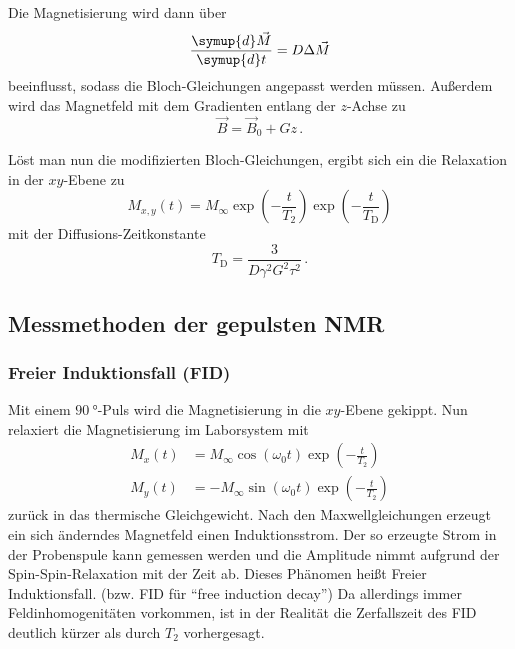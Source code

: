 Die Magnetisierung wird dann über
\begin{equation}
    \frac{\symup{d} \vec{M}}{\symup{d} t} = D \Delta \vec{M}
\end{equation}
beeinflusst, sodass die Bloch-Gleichungen angepasst werden müssen.
Außerdem wird das Magnetfeld mit dem Gradienten entlang der $z$-Achse zu
\begin{equation}
    \vec{B} = \vec{B}_0 + G z \, .
\end{equation}

Löst man nun die modifizierten Bloch-Gleichungen, ergibt sich ein die Relaxation in der $xy$-Ebene zu
\begin{equation}
    M_{x,y}(t) = M_\infty \exp\left( -\frac{t}{T_2} \right) \exp\left( -\frac{t}{T_\text{D}} \right)
    \label{eq:TD_relaxation}
\end{equation}
mit der Diffusions-Zeitkonstante
\begin{equation}
    T_\text{D} = \frac{3}{D \gamma^2 G^2 \tau^2} \, .
    \label{eq:TD}
\end{equation}


%

\subsection{Messmethoden der gepulsten NMR}
\label{ssec:Messmethoden}

\subsubsection{Freier Induktionsfall (FID)}
\label{sssec:FID}

Mit einem $\SI{90}{\degree}$-Puls wird die Magnetisierung in die $xy$-Ebene gekippt.
Nun relaxiert die Magnetisierung im Laborsystem mit 
\begin{align}
    M_x(t) &= M_\infty \cos(\omega_0 t) \exp\left( -\frac{t}{T_2} \right) \\
    M_y(t) &= -M_\infty \sin(\omega_0 t) \exp\left( -\frac{t}{T_2} \right)
\end{align}
zurück in das thermische Gleichgewicht.
Nach den Maxwellgleichungen erzeugt ein sich änderndes Magnetfeld einen Induktionsstrom.
Der so erzeugte Strom in der Probenspule kann gemessen werden und die Amplitude nimmt aufgrund der Spin-Spin-Relaxation mit der Zeit ab.
Dieses Phänomen heißt Freier Induktionsfall. (bzw. FID für \enquote{free induction decay})
Da allerdings immer Feldinhomogenitäten vorkommen, ist in der Realität die Zerfallszeit des FID deutlich kürzer als durch $T_2$ vorhergesagt.


